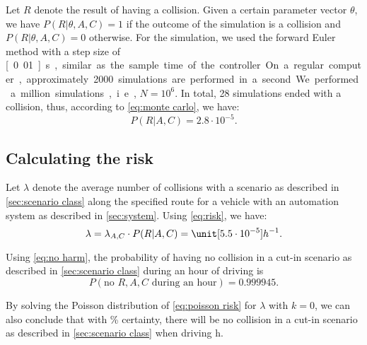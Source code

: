 Let $R$ denote the result of having a collision. Given a certain parameter vector $\theta$, we have $P(R|\theta,A,C)=1$ if the outcome of the simulation is a collision and $P(R|\theta,A,C)=0$ otherwise. For the simulation, we used the forward Euler method with a step size of \unit[0.01]{s}, similar as the sample time of the controller. On a regular computer, approximately 2000 simulations are performed in a second. We performed a million simulations, i.e., $N=10^6$. In total, 28 simulations ended with a collision, thus, according to \cref{eq:monte carlo}, we have:
\begin{equation}
	P(R|A,C) = 2.8 \cdot 10^{-5}.
\end{equation}



\subsection{Calculating the risk}
\label{sec:example risk}

Let $\lambda$ denote the average number of collisions with a scenario as described in \cref{sec:scenario class} along the specified route for a vehicle with an automation system as described in \cref{sec:system}. Using \cref{eq:risk}, we have:
\begin{equation}
	\lambda = \lambda_{A,C} \cdot P(R|A,C) = \unit[5.5 \cdot 10^{-5}]{h^{-1}}.
\end{equation}

Using \cref{eq:no harm}, the probability of having no collision in a cut-in scenario as described in \cref{sec:scenario class} during an hour of driving is
\begin{equation}
	P(\text{no }R,A,C\text{ during an hour}) = 0.999945.
\end{equation}

By solving the Poisson distribution of \cref{eq:poisson risk} for $\lambda$ with $k=0$, we can also conclude that with \unit[95]{\%} certainty, there will be no collision in a cut-in scenario as described in \cref{sec:scenario class} when driving \unit[925]{h}.
